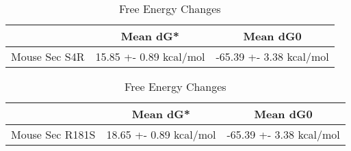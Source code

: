                                                          
                                                        \begin{table}[ht]
                                                          \centering
                                                          \begin{tabular}{|c|c|c|}
                                                          \hline
                                                            & Mean dG* & Mean dG0 \\
                                                          \hline
                                                          Mouse Sec  S4R & 15.85 +- 0.89 kcal/mol & -65.39 +- 3.38 kcal/mol \\
                                                          \hline
                                                          \end{tabular}
                                                          \caption{Free Energy Changes}
                                                          \end{table}

                                                            \begin{table}[ht]
                                                              \centering
                                                              \begin{tabular}{|c|c|c|}
                                                              \hline
                                                                & Mean dG* & Mean dG0 \\
                                                              \hline
                                                              Mouse Sec R181S & 18.65 +- 0.89 kcal/mol & -65.39 +- 3.38 kcal/mol \\
                                                              \hline
                                                              \end{tabular}
                                                              \caption{Free Energy Changes}
                                                              \end{table}
                                                              
